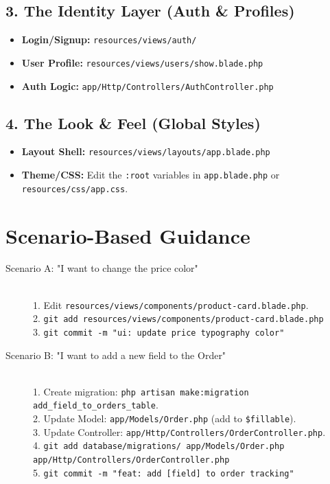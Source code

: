 \documentclass[12pt,a4paper]{article}
\begin{document}
\subsection{3. The Identity Layer (Auth \& Profiles)}
\begin{itemize}
    \item \textbf{Login/Signup:} \texttt{resources/views/auth/}
    \item \textbf{User Profile:} \texttt{resources/views/users/show.blade.php}
    \item \textbf{Auth Logic:} \texttt{app/Http/Controllers/AuthController.php}
\end{itemize}

\subsection{4. The Look \& Feel (Global Styles)}
\begin{itemize}
    \item \textbf{Layout Shell:} \texttt{resources/views/layouts/app.blade.php}
    \item \textbf{Theme/CSS:} Edit the \texttt{:root} variables in \texttt{app.blade.php} or \texttt{resources/css/app.css}.
\end{itemize}

\section{Scenario-Based Guidance}

\begin{description}
    \item[Scenario A: "I want to change the price color"] \quad \\
    1. Edit \texttt{resources/views/components/product-card.blade.php}. \\
    2. \texttt{git add resources/views/components/product-card.blade.php} \\
    3. \texttt{git commit -m "ui: update price typography color"}
    
    \item[Scenario B: "I want to add a new field to the Order"] \quad \\
    1. Create migration: \texttt{php artisan make:migration add\_field\_to\_orders\_table}. \\
    2. Update Model: \texttt{app/Models/Order.php} (add to \texttt{\$fillable}). \\
    3. Update Controller: \texttt{app/Http/Controllers/OrderController.php}. \\
    4. \texttt{git add database/migrations/ app/Models/Order.php app/Http/Controllers/OrderController.php} \\
    5. \texttt{git commit -m "feat: add [field] to order tracking"}
\end{description}
\end{document}
